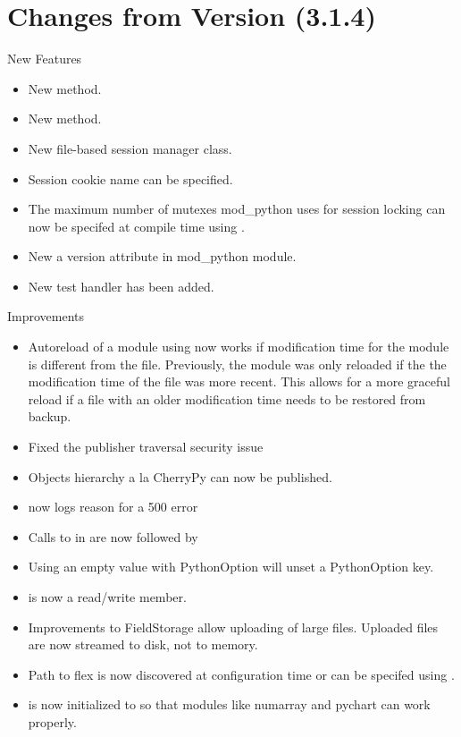 \chapter{Changes from Version (3.1.4)\label{app-changes}}

  
  New Features

  \begin{itemize}
    \item
      New  method.
    \item
      New  method.
    \item
      New file-based session manager class.
    \item
      Session cookie name can be specified.
    \item
      The maximum number of mutexes mod_python uses for session locking
      can now be specifed at compile time using 
      .
    \item
      New a version attribute in mod_python module.
    \item
      New test handler  has been added.
  \end{itemize}

  Improvements

  \begin{itemize}
    \item
      Autoreload of a module using  now works if
      modification time for the module is different from the file.
      Previously, the module was only reloaded if the the modification 
      time of the file was more recent. This allows for a more graceful
      reload if a file with an older modification time needs to be
      restored from backup.
    \item
      Fixed the publisher traversal security issue
    \item
      Objects hierarchy a la CherryPy can now be published.
    \item
       now logs reason for a 500 error
    \item
      Calls to  in  are now followed by 
    \item
      Using an empty value with PythonOption will unset a PythonOption key.
    \item
       is now a read/write member.
    \item
      Improvements to FieldStorage allow uploading of large files. Uploaded
      files are now streamed to disk, not to memory.
    \item
      Path to flex is now discovered at configuration time or can be
      specifed using .
    \item
       is now initialized to  so that modules
      like numarray and pychart can work properly.
  \end{itemize}

